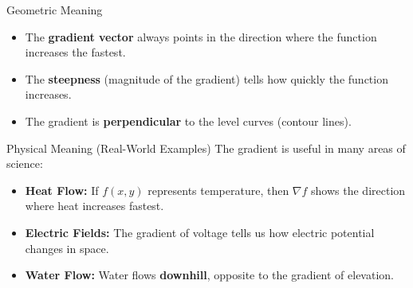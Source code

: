 \documentclass{beamer}
\def\lthtmlcheckvsize{\ifdim\ht\sizebox<\vsize 
  \ifdim\wd\sizebox<\hsize\expandafter\hfill\fi \expandafter\vfill
  \else\expandafter\vss\fi}%
\begin{document}
{\newpage\clearpage
{}%
\begin{frame}{Geometric Meaning}
    \begin{itemize}
        \item The \textbf{gradient vector} always points in the direction where the function increases the fastest.
        \item The \textbf{steepness} (magnitude of the gradient) tells how quickly the function increases.
        \item The gradient is \textbf{perpendicular} to the level curves (contour lines).
    \end{itemize}
\end{frame}%
\lthtmlfigureZ
\lthtmlcheckvsize\clearpage}

{\newpage\clearpage
{}%
\begin{frame}{Physical Meaning (Real-World Examples)}
    The gradient is useful in many areas of science:
    \begin{itemize}
        \item \textbf{Heat Flow:} If \( f(x, y) \) represents temperature, then \( \nabla f \) shows the direction where heat increases fastest.
        \item \textbf{Electric Fields:} The gradient of voltage tells us how electric potential changes in space.
        \item \textbf{Water Flow:} Water flows \textbf{downhill}, opposite to the gradient of elevation.
    \end{itemize}
\par
\centering
\par
\end{frame}%
\lthtmlfigureZ
\lthtmlcheckvsize\clearpage}
\end{document}
